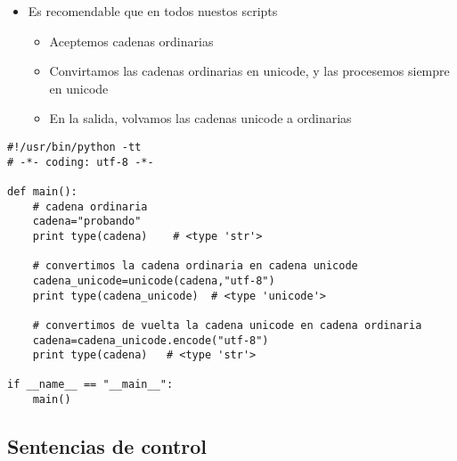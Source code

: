 \documentclass[ucs]{beamer}
\begin{document}

\begin{frame}[fragile]
\begin{itemize}

\item
Es recomendable que en todos nuestos scripts
\begin{itemize}
\item
Aceptemos cadenas ordinarias
\item
Convirtamos las cadenas ordinarias en unicode, y las procesemos siempre en unicode 
\item
En la salida, volvamos las cadenas unicode a ordinarias
\end{itemize}
\end{itemize}


\end{frame}

\begin{frame}[fragile]



  \begin{footnotesize}
  \begin{center}
  \end{center}
  \begin{verbatim}
#!/usr/bin/python -tt
# -*- coding: utf-8 -*-

def main():
    # cadena ordinaria
    cadena="probando"
    print type(cadena)    # <type 'str'>

    # convertimos la cadena ordinaria en cadena unicode
    cadena_unicode=unicode(cadena,"utf-8")
    print type(cadena_unicode)  # <type 'unicode'>

    # convertimos de vuelta la cadena unicode en cadena ordinaria
    cadena=cadena_unicode.encode("utf-8")
    print type(cadena)   # <type 'str'>

if __name__ == "__main__":
    main()

  \end{verbatim}
  \end{footnotesize}

\end{frame}





\subsection{Sentencias de control}
\end{document}
